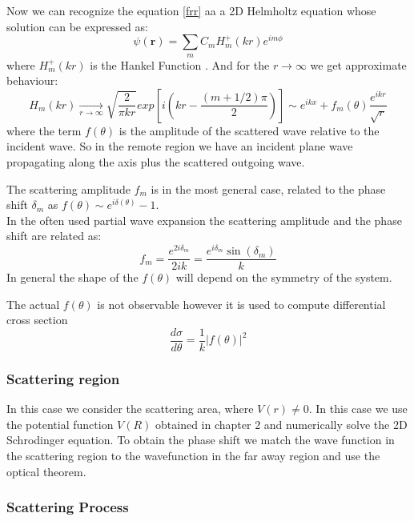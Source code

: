 Now we can recognize the equation \eqref{frr} aa a 2D Helmholtz equation whose solution can be expressed as:
\begin{equation}\label{2DS2H}
\psi(\mathbf{r}) = \sum_{m}{C_mH_m^+(kr)e^{im\phi}}
\end{equation}
where $ H_m^+(kr) $ is the Hankel Function .
And for the $ r \rightarrow \infty $ we get approximate behaviour:
\begin{equation}\label{2DS2}
    H_m(kr) \xrightarrow[r \rightarrow \infty]{}\sqrt{\frac{2}{\pi k r}}exp\left[i\left(kr - \frac{(m + 1/2)\pi}{2}\right)\right] \sim e^{ikx} + f_m(\theta) \frac{e^{ikr}}{\sqrt{r}}
\end{equation}
where the term $ f(\theta) $ is the amplitude of the scattered wave relative to the incident wave. 
So in the remote region we have an incident plane wave propagating along the axis plus the scattered outgoing wave.

The scattering amplitude $ f_m $ is in the most general case, related to the phase shift $ \delta_m $ as $ f(\theta) \sim e^{i\delta(\theta)} - 1 $. \\
In the often used partial wave expansion the scattering amplitude and the phase shift are related as:
\begin{equation}
    f_m = \frac{e^{2i \delta_m}}{2ik} = \frac{e^{i\delta_m}\sin(\delta_m)}{k}
\end{equation}
In general the shape of the $ f(\theta) $ will depend on the symmetry of the system.

The actual $ f(\theta) $ is not observable however it is used to compute differential cross section
\begin{equation}
    \frac{d\sigma}{d\theta} = \frac{1}{k}\left|f(\theta)\right|^2
\end{equation}

\subsubsection{\textbf{Scattering region}}

In this case we consider the scattering area, where $ V(r) \neq 0 $. In this case we use the potential function $ V(R) $ obtained in chapter 2 and numerically solve the 2D Schrodinger equation. To obtain the phase shift we match the wave function in the scattering region to the wavefunction in the far away region and use the optical theorem.

\subsubsection{Scattering Process}

